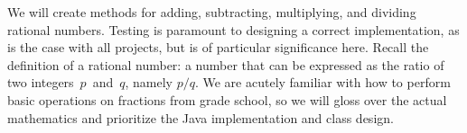 









We will create methods for adding, subtracting, multiplying, and dividing rational numbers. 
Testing is paramount to designing a correct implementation, as is the case with all projects, but is of particular significance here. 
Recall the definition of a rational number: a number that can be expressed as the ratio of two integers~$p$~and~$q$, namely $p/q$. 
We are acutely familiar with how to perform basic operations on fractions from grade school, so we will gloss over the actual mathematics and prioritize the Java implementation and class design.

